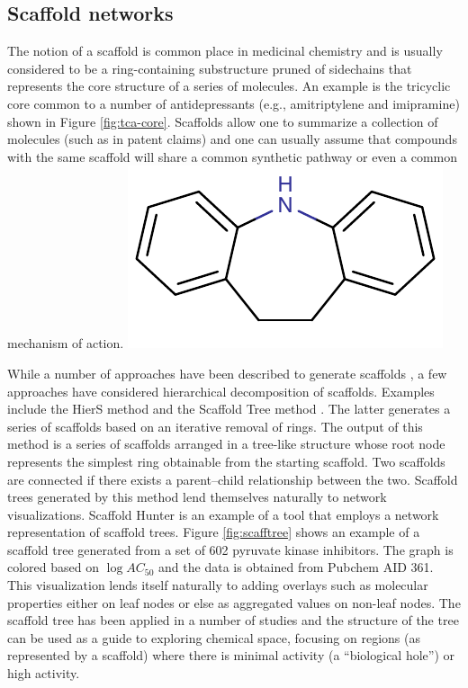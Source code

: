 \documentclass[12pt,letterpaper]{article}
\begin{document}
\subsection{Scaffold networks}
\label{sec:scaffold-networks}

The notion of a scaffold is common place in medicinal chemistry and is
usually considered to be a ring-containing substructure pruned of
sidechains that represents the core structure of a series of
molecules. An example is the tricyclic core common to a number of
antidepressants (e.g., amitriptylene and imipramine) shown in Figure
\ref{fig:tca-core}. Scaffolds allow one to summarize a collection of
molecules (such as in patent claims) and one can usually assume that
compounds with the same scaffold will share a common synthetic pathway
or even a common mechanism of action.
{}
{\includegraphics{img/tca-core}}


While a number of approaches have been described to generate scaffolds
\cite{Lewell:1998aa,Bemis:1996aa,Katritzky:2000wf}, a few approaches
have considered hierarchical decomposition of scaffolds. Examples
include the HierS method \cite{Wilkens:2005il} and the Scaffold Tree
method \cite{Schuffenhauer:2007oz}. The latter generates a series of
scaffolds based on an iterative removal of rings. The output of this
method is a series of scaffolds arranged in a tree-like structure
whose root node represents the simplest ring obtainable from the
starting scaffold.  Two scaffolds are connected if there exists a
parent--child relationship between the two. Scaffold trees generated
by this method lend themselves naturally to network
visualizations. Scaffold Hunter \cite{Wetzel:2009uq} is an example of
a tool that employs a network representation of scaffold trees. Figure
\ref{fig:scafftree} shows an example of a scaffold tree generated from
a set of 602 pyruvate kinase inhibitors. The graph is colored based on
$\log AC_{50}$ and the data is obtained from Pubchem AID 361. This
visualization lends itself naturally to adding overlays such as
molecular properties either on leaf nodes or else as aggregated values
on non-leaf nodes. The scaffold tree has been applied in a number of
studies \cite{Wetzel:2009uq,Renner:2009wm} and the structure of the
tree can be used as a guide to exploring chemical space, focusing on
regions (as represented by a scaffold) where there is minimal activity
(a ``biological hole'') or high activity.
\end{document}
